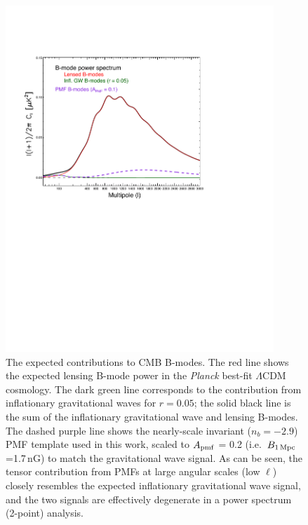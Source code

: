 \documentclass[apj]{emulateapj}
\newcommand{\apmf}{\ensuremath{A_{\rm pmf}}}
\newcommand{\bpmf}{\ensuremath{B_{\rm 1\,Mpc}}}
\newcommand{\lcdm}{\ensuremath{\Lambda}CDM}
\newcommand{\planck}{{\sl Planck}}
\begin{document}
\begin{figure}[htb]\centering
\includegraphics[width=0.9\textwidth,clip,trim={1.5cm 12.cm 5cm 4cm}]{pmf_templates.pdf}
  \caption[CMB polarization from PMFs]{
  The expected contributions to CMB B-modes. 
  The red line shows the expected lensing B-mode power in the \planck{} best-fit \lcdm{} cosmology. 
  The dark green line corresponds to the contribution from inflationary gravitational waves for $r=0.05$; the solid black line is the sum of the inflationary gravitational wave and lensing B-modes. 
  The dashed purple line shows the nearly-scale invariant ($n_b=-2.9$) PMF template used in this work, scaled to \apmf{} = 0.2 (i.e.~\bpmf{}=1.7\,nG) to match the gravitational wave signal. 
  As can be seen, the tensor contribution from PMFs at large angular scales (low $\ell$) closely resembles the expected inflationary gravitational wave signal, and the two signals are effectively degenerate in a power spectrum (2-point) analysis.
      \label{fig:pmf-bb}
  }
\end{figure}
\end{document}
